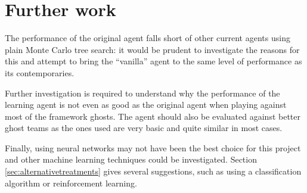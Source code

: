 \section{Further work}

The performance of the original agent falls short of other current agents using plain Monte Carlo tree search: it would be prudent to investigate the reasons for this and attempt to bring the ``vanilla'' agent to the same level of performance as its contemporaries.

Further investigation is required to understand why the performance of the learning agent is not even as good as the original agent when playing against most of the framework ghosts.  The agent should also be evaluated against better ghost teams as the ones used are very basic and quite similar in most cases.

Finally, using neural networks may not have been the best choice for this project and other machine learning techniques could be investigated.  Section \ref{sec:alternativetreatments} gives several suggestions, such as using a classification algorithm or reinforcement learning.
